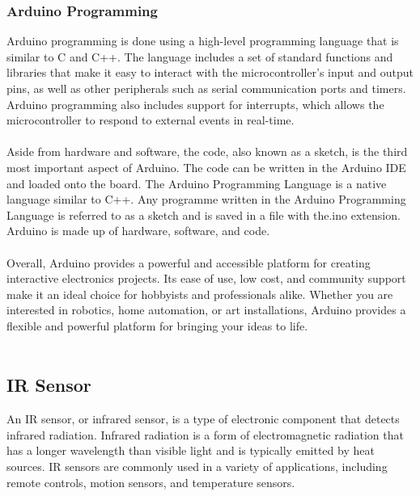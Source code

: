 \documentclass[12pt]{article}
\begin{document}
\subsubsection{Arduino Programming}
Arduino programming is done using a high-level programming language that is similar to C and C++. The language includes a set of standard functions and libraries that make it easy to interact with the microcontroller's input and output pins, as well as other peripherals such as serial communication ports and timers. Arduino programming also includes support for interrupts, which allows the microcontroller to respond to external events in real-time.
\\
\\
Aside from hardware and software, the code, also known as a sketch, is the third most important aspect of Arduino. The code can be written in the Arduino IDE and loaded onto the board. The Arduino Programming Language is a native language similar to C++. Any programme written in the Arduino Programming Language is referred to as a sketch and is saved in a file with the.ino extension.
Arduino is made up of hardware, software, and code.
\\
\\
Overall, Arduino provides a powerful and accessible platform for creating interactive electronics projects. Its ease of use, low cost, and community support make it an ideal choice for hobbyists and professionals alike. Whether you are interested in robotics, home automation, or art installations, Arduino provides a flexible and powerful platform for bringing your ideas to life.
\\
\\
\subsection{IR Sensor}
An IR sensor, or infrared sensor, is a type of electronic component that detects infrared radiation. Infrared radiation is a form of electromagnetic radiation that has a longer wavelength than visible light and is typically emitted by heat sources. IR sensors are commonly used in a variety of applications, including remote controls, motion sensors, and temperature sensors.
\\    
\\
\end{document}
